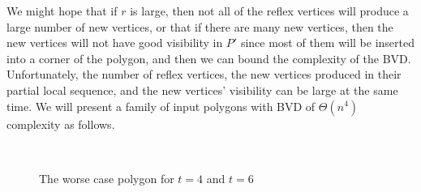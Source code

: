 \documentclass[letterpaper, 10 pt, conference]{ieeeconf}  %
\begin{document}
We might hope that if $r$ is large, then not all of the reflex vertices will produce a large number of new vertices, or that if there are many new vertices, then the new vertices will not have good visibility in $P'$ since most of them will be inserted into a corner of the polygon, and then we can bound the complexity of the BVD. Unfortunately, the number of reflex vertices, the new vertices produced in their partial local sequence, and the new vertices' visibility can be large at the same time. We will present a family of input polygons with BVD of $\Theta(n^4)$ complexity as follows. 
\begin{figure}
\hspace{-40px}
\centering
{}\\
\caption{The worse case polygon for $t = 4$ and $t = 6$}
\label{fig:chestnut}
\end{figure}
\end{document}
